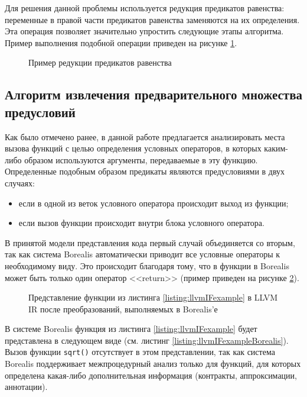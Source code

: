 Для решения данной проблемы используется редукция предикатов равенства: переменные в правой части предикатов равенства заменяются на их определения. Эта операция позволяет значительно упростить следующие этапы алгоритма. Пример выполнения подобной операции приведен на рисунке \ref{image:equalityMapperExample}.
\begin{figure}[h!]
\caption{Пример редукции предикатов равенства}
\label{image:equalityMapperExample}
\end{figure}

\subsection{Алгоритм извлечения предварительного множества предусловий}
\label{subsection:extraction}
Как было отмечено ранее, в данной работе предлагается анализировать места вызова функций с целью определения условных операторов, в которых каким-либо образом используются аргументы, передаваемые в эту функцию. Определенные подобным образом предикаты являются предусловиями в двух случаях:
\begin{itemize}
\item если в одной из веток условного оператора происходит выход из функции;
\item если вызов функции происходит внутри блока условного оператора.
\end{itemize}

В принятой модели представления кода первый случай объединяется со вторым, так как система Borealis автоматически приводит все условные операторы к необходимому виду. Это происходит благодаря тому, что в функции в Borealis может быть только один оператор <<return>> (пример приведен на рисунке \ref{image:llvmIFcfg}).

 	
\begin{figure}[h!]
\caption{Представление функции из листинга \ref{listing:llvmIFexample} в LLVM IR после преобразований, выполняемых в Borealis'е}
\label{image:llvmIFcfg}
\end{figure}

В системе Borealis функция из листинга \ref{listing:llvmIFexample} будет представлена в следующем виде (см. листинг \ref{listing:llvmIFexampleBorealis}). Вызов функции \texttt{sqrt()} отсутствует в этом представлении, так как система Borealis поддерживает межпроцедурный анализ только для функций, для которых определена какая-либо дополнительная информация (контракты, аппроксимации, аннотации).


